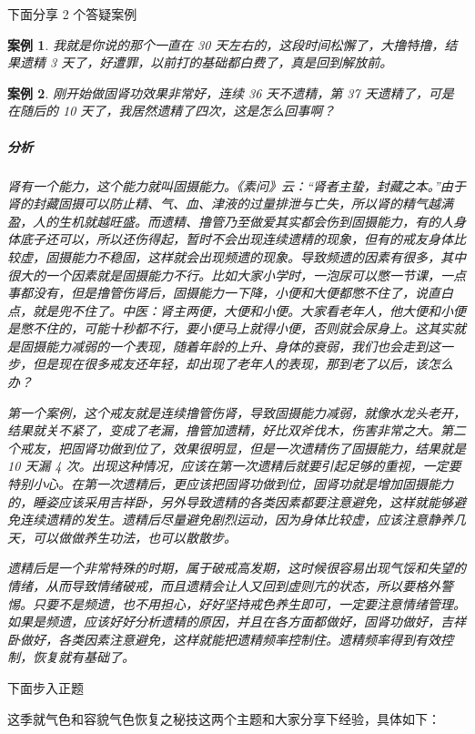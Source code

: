 \documentclass[fontset=founder]{ctexart}
\newtheorem{case}{案例}
\begin{document}
下面分享 2 个答疑案例

\begin{case}
    我就是你说的那个一直在 30 天左右的，这段时间松懈了，大撸特撸，结果遗精 3 天了，好遭罪，以前打的基础都白费了，真是回到解放前。
\end{case}

\begin{case}
    刚开始做固肾功效果非常好，连续 36 天不遗精，第 37 天遗精了，可是在随后的 10 天了，我居然遗精了四次，这是怎么回事啊？

    \subparagraph{分析} 肾有一个能力，这个能力就叫固摄能力。《素问》云：“肾者主蛰，封藏之本。”由于肾的封藏固摄可以防止精、气、血、津液的过量排泄与亡失，所以肾的精气越满盈，人的生机就越旺盛。而遗精、撸管乃至做爱其实都会伤到固摄能力，有的人身体底子还可以，所以还伤得起，暂时不会出现连续遗精的现象，但有的戒友身体比较虚，固摄能力不稳固，这样就会出现频遗的现象。导致频遗的因素有很多，其中很大的一个因素就是固摄能力不行。比如大家小学时，一泡尿可以憋一节课，一点事都没有，但是撸管伤肾后，固摄能力一下降，小便和大便都憋不住了，说直白点，就是兜不住了。中医：肾主两便，大便和小便。大家看老年人，他大便和小便是憋不住的，可能十秒都不行，要小便马上就得小便，否则就会尿身上。这其实就是固摄能力减弱的一个表现，随着年龄的上升、身体的衰弱，我们也会走到这一步，但是现在很多戒友还年轻，却出现了老年人的表现，那到老了以后，该怎么办？

    第一个案例，这个戒友就是连续撸管伤肾，导致固摄能力减弱，就像水龙头老开，结果就关不紧了，变成了老漏，撸管加遗精，好比双斧伐木，伤害非常之大。第二个戒友，把固肾功做到位了，效果很明显，但是一次遗精伤了固摄能力，结果就是 10 天漏 4 次。出现这种情况，应该在第一次遗精后就要引起足够的重视，一定要特别小心。在第一次遗精后，更应该把固肾功做到位，固肾功就是增加固摄能力的，睡姿应该采用吉祥卧，另外导致遗精的各类因素都要注意避免，这样就能够避免连续遗精的发生。遗精后尽量避免剧烈运动，因为身体比较虚，应该注意静养几天，可以做做养生功法，也可以散散步。

    遗精后是一个非常特殊的时期，属于破戒高发期，这时候很容易出现气馁和失望的情绪，从而导致情绪破戒，而且遗精会让人又回到虚则亢的状态，所以要格外警惕。只要不是频遗，也不用担心，好好坚持戒色养生即可，一定要注意情绪管理。如果是频遗，应该好好分析遗精的原因，并且在各方面都做好，固肾功做好，吉祥卧做好，各类因素注意避免，这样就能把遗精频率控制住。遗精频率得到有效控制，恢复就有基础了。
\end{case}

下面步入正题

这季就气色和容貌气色恢复之秘技这两个主题和大家分享下经验，具体如下：
\end{document}
